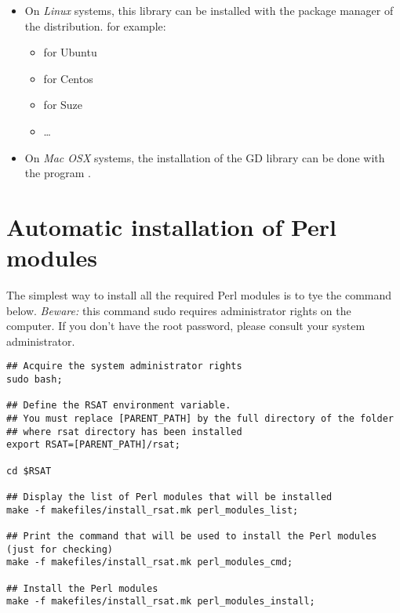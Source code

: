 \documentclass[12pt,a4paper, oneside]{scrreprt} %
\begin{document}
\begin{itemize}

\item On \emph{Linux} systems, this library can be installed with the
  package manager of the distribution. for example:
  \begin{itemize}
  \item {} for Ubuntu
  \item  {} for Centos
  \item {} for Suze
  \item \ldots
  \end{itemize}
  
\item On \emph{Mac OSX} systems, the installation of the GD library
  can be done with the program .
  


\end{itemize}

\section{Automatic installation of Perl modules}

The simplest way to install all the required Perl modules is to tye
the command below. \emph{Beware:} this command sudo requires
administrator rights on the computer. If you don't have the root
password, please consult your system administrator.

\begin{lstlisting}
## Acquire the system administrator rights
sudo bash;

## Define the RSAT environment variable.
## You must replace [PARENT_PATH] by the full directory of the folder
## where rsat directory has been installed
export RSAT=[PARENT_PATH]/rsat;

cd $RSAT

## Display the list of Perl modules that will be installed
make -f makefiles/install_rsat.mk perl_modules_list;

## Print the command that will be used to install the Perl modules (just for checking)
make -f makefiles/install_rsat.mk perl_modules_cmd;

## Install the Perl modules
make -f makefiles/install_rsat.mk perl_modules_install;
\end{lstlisting}
\end{document}
